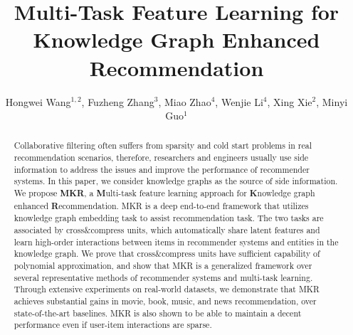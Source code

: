 \documentclass[sigconf]{acmart}
\begin{document}
\title{Multi-Task Feature Learning for Knowledge Graph Enhanced Recommendation}


\author{Hongwei Wang$^{1,2}$, Fuzheng Zhang$^3$, Miao Zhao$^4$, Wenjie Li$^4$, Xing Xie$^2$, Minyi Guo$^1$}


\begin{abstract}
	Collaborative filtering often suffers from sparsity and cold start problems in real recommendation scenarios, therefore, researchers and engineers usually use side information to address the issues and improve the performance of recommender systems.
	In this paper, we consider knowledge graphs as the source of side information.
 	We propose \textbf{MKR}, a \textbf{M}ulti-task feature learning approach for \textbf{K}nowledge graph enhanced \textbf{R}ecommendation.
 	MKR is a deep end-to-end framework that utilizes knowledge graph embedding task to assist recommendation task.
 	The two tasks are associated by cross$\&$compress units, which automatically share latent features and learn high-order interactions between items in recommender systems and entities in the knowledge graph.
 	We prove that cross$\&$compress units have sufficient capability of polynomial approximation, and show that MKR is a generalized framework over several representative methods of recommender systems and multi-task learning.
 	Through extensive experiments on real-world datasets, we demonstrate that MKR achieves substantial gains in movie, book, music, and news recommendation, over state-of-the-art baselines.
 	MKR is also shown to be able to maintain a decent performance even if user-item interactions are sparse.
\end{abstract}


\maketitle
\end{document}
